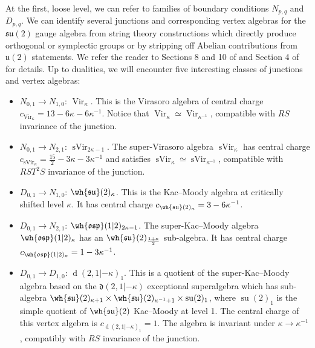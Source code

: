 \documentclass[11pt,reqno]{amsart}
\theoremstyle{plain}
\numberwithin{equation}{section}
\DeclareMathOperator{\Vir}{Vir}
\DeclareMathOperator{\sVir}{sVir}
\DeclareMathOperator{\td}{d}
\DeclareMathOperator{\tsu}{su}
\theoremstyle{definition}
\begin{document}
At the first, loose level, we can refer to families of boundary conditions $N_{p,q}$ and $D_{p,q}$. We can identify several junctions and corresponding vertex algebras for the 
$\mathfrak{su}(2)$ gauge algebra from string theory constructions which directly produce orthogonal or symplectic groups or by stripping off Abelian contributions from $\mathfrak{u}(2)$
statements. We refer the reader to Sections 8 and 10 of \cite{GR} and Section 4 of \cite{CG} for details.  Up to dualities, we will
encounter five interesting classes of junctions and vertex algebras:

\medskip

\begin{itemize}
\item $N_{0,1} \to N_{1,0}$: $\Vir_\kappa$. This is the Virasoro algebra of central charge $c_{\Vir_\kappa} = 13- 6 \kappa - 6 \kappa^{-1}$. Notice that $\Vir_\kappa \simeq \Vir_{\kappa^{-1}}$, compatible with $RS$ invariance of the junction.  

\medskip

\item $N_{0,1} \to N_{2,1}$: $\sVir_{2 \kappa-1}$. The super-Virasoro algebra $\sVir_\kappa$ has central charge $c_{\sVir_\kappa} = \frac{15}{2}- 3 \kappa - 3 \kappa^{-1}$ and satisfies $\sVir_\kappa \simeq \sVir_{\kappa^{-1}}$, compatible with $RST^2S$ invariance of the junction. 

\medskip

\item $D_{0,1} \to N_{1,0}$: $\wh{\mathfrak{su}}(2)_{\kappa}$. This is the Kac--Moody algebra at critically shifted level $\kappa$. It has central charge $c_{\wh{\mathfrak{su}}(2)_\kappa} = 3-6 \kappa^{-1}$.

\medskip

\item $D_{0,1} \to N_{2,1}$: $\wh{\mathfrak{osp}}(1|2)_{2\kappa-1}$. The super-Kac--Moody algebra $\wh{\mathfrak{osp}}(1|2)_{\kappa}$ has an $\wh{\mathfrak{su}}(2)_{\frac{1+\kappa}{2}}$ sub-algebra. 
It has central charge $c_{\wh{\mathfrak{osp}}(1|2)_\kappa} =1-3 \kappa^{-1}$.

\medskip

\item $D_{0,1} \to D_{1,0}$: $\td(2,1|-\kappa)_1$. This is a quotient of the super-Kac--Moody
  algebra based on the $\mathfrak{d}(2,1|-\kappa)$ exceptional
  superalgebra which has sub-algebra $\wh{\mathfrak{su}}(2)_{\kappa+1}
  \times \wh{\mathfrak{su}}(2)_{\kappa^{-1}+1} \times \tsu(2)_1$, where
  $\tsu(2)_1$ is the simple quotient of $\wh{\mathfrak{su}}(2)$ Kac--Moody
  at level 1. The central charge of this vertex algebra is
  $c_{\td(2,1|-\kappa)_1} = 1$. The algebra is invariant under $\kappa
  \to \kappa^{-1}$, compatibly with $RS$ invariance of the junction. 
\end{itemize}
\end{document}
